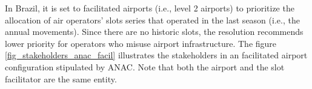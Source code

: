  In Brazil, it is set to facilitated airports (i.e., level 2 airports) to prioritize the allocation of air operators’ slots series that operated in the last season (i.e., the annual movements). Since there are no historic slots, the resolution recommends lower priority for operators who misuse airport infrastructure. The figure \ref{fig_stakeholders_anac_facil} illustrates the stakeholders in an facilitated airport configuration stipulated by \acrshort{ANAC}. Note that both the airport and the slot facilitator are the same entity.

